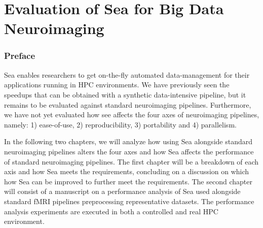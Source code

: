 \part{Evaluation of Sea for Big Data Neuroimaging}
\section*{Preface}

Sea enables researchers to get on-the-fly automated data-management for their
applications running in HPC environments. We have previously seen the speedups that
can be obtained with a synthetic data-intensive pipeline, but it remains to be evaluated
against standard neuroimaging pipelines. Furthermore, we have not yet evaluated how see affects
the four axes of neuroimaging pipelines, namely: 1) ease-of-use, 2) reproducibility,
3) portability and 4) parallelism.

In the following two chapters, we will analyze how using Sea alongside standard neuroimaging
pipelines alters the four axes and how Sea affects the performance of standard neuroimaging pipelines.
The first chapter will be a breakdown of each axis and how Sea meets the requirements, concluding
on a discussion on which how Sea can be improved to further meet the requirements. The second chapter
will consist of a manuscript on a performance analysis of Sea used alongside standard fMRI pipelines
preprocessing representative datasets. The performance analysis experiments are executed in both a controlled and
real HPC environment.